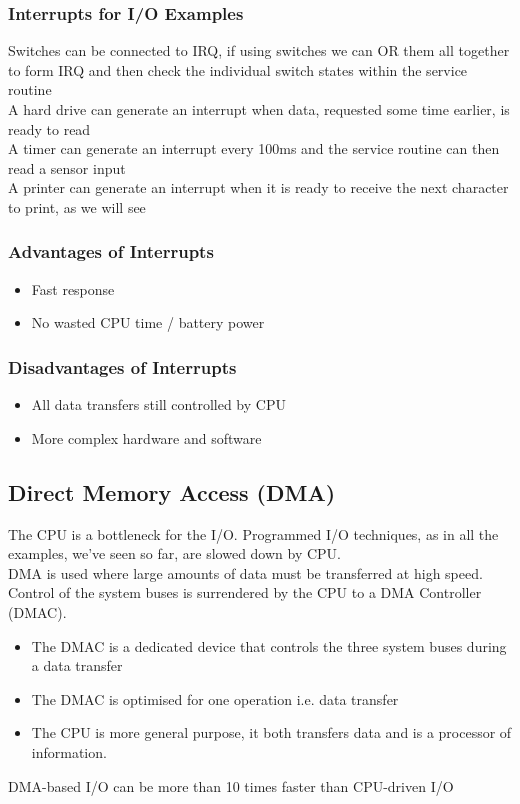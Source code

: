 \documentclass[a4paper]{article}
\theoremstyle{plain}
\theoremstyle{definition}
\theoremstyle{remark}
\begin{document}
\subsubsection{Interrupts for I/O Examples}
Switches can be connected to IRQ, if using switches we can OR them all together to form IRQ and then check the individual switch states within the service routine \\
A hard drive can generate an interrupt when data, requested some time earlier, is ready to read \\
A timer can generate an interrupt every 100ms and the service routine can then read a sensor input \\
A printer can generate an interrupt when it is ready to receive the next character to print, as we will see
\subsubsection{Advantages of Interrupts}
\begin{itemize}
	\item Fast response
	\item No wasted CPU time / battery power
\end{itemize}
\subsubsection{Disadvantages of Interrupts}
\begin{itemize}
	\item All data transfers still controlled by CPU
	\item More complex hardware and software
\end{itemize}
\subsection{Direct Memory Access (DMA)}
The CPU is a bottleneck for the I/O. Programmed I/O techniques, as in all the examples, we've seen so far, are slowed down by CPU. \\
DMA is used where large amounts of data must be transferred at high speed. Control of the system buses is surrendered by the CPU to a DMA Controller (DMAC).
\begin{itemize}
	\item The DMAC is a dedicated device that controls the three system buses during a data transfer
	\item The DMAC is optimised for one operation i.e. data transfer
	\item The CPU is more general purpose, it both transfers data and is a processor of information.
\end{itemize}
DMA-based I/O can be more than 10 times faster than CPU-driven I/O
\end{document}
